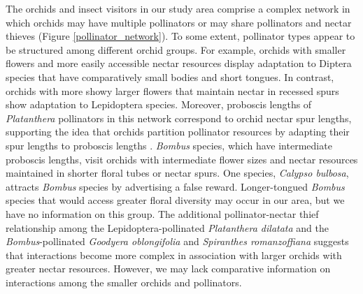 \begin{multicols}{2}
The orchids and insect visitors in our study area comprise a complex
network in which orchids may have multiple pollinators or may share
pollinators and nectar thieves (Figure \ref{pollinator_network}). To some extent, pollinator
types appear to be structured among different orchid groups. For
example, orchids with smaller flowers and more easily accessible nectar
resources display adaptation to Diptera species that have comparatively
small bodies and short tongues. In contrast, orchids with more showy
larger flowers that maintain nectar in recessed spurs show adaptation to
Lepidoptera species. Moreover, proboscis lengths of \emph{Platanthera}
pollinators in this network correspond to orchid nectar spur lengths,
supporting the idea that orchids partition pollinator resources by
adapting their spur lengths to proboscis lengths \citep{HapemanInoue1997}. \emph{Bombus} species, which have intermediate proboscis lengths, visit
orchids with intermediate flower sizes and nectar resources maintained
in shorter floral tubes or nectar spurs. One species, \emph{Calypso
bulbosa}, attracts \emph{Bombus} species by advertising a false reward.
Longer-tongued \emph{Bombus} species that would access greater floral
diversity may occur in our area, but we have no information on this
group. The additional pollinator-nectar thief relationship among the
Lepidoptera-pollinated \emph{Platanthera dilatata} and the
\emph{Bombus}-pollinated \emph{Goodyera oblongifolia} and
\emph{Spiranthes romanzoffiana} suggests that interactions become more
complex in association with larger orchids with greater nectar
resources. However, we may lack comparative information on interactions
among the smaller orchids and pollinators.



\end{multicols}

